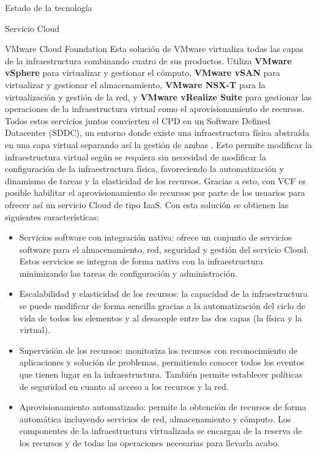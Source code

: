 \begin{chapter}{Estado de la tecnología}
\begin{section}{Servicio Cloud}
\begin{subsection}{VMware Cloud Foundation}
        Esta solución de VMware virtualiza todas las capas de la infraestructura combinando cuatro de sus productos. Utiliza \textbf{VMware vSphere} para virtualizar y gestionar el cómputo, \textbf{VMware vSAN} para virtualizar y gestionar el almacenamiento, \textbf{VMware NSX-T} para la virtualización y gestión de la red, y \textbf{VMware vRealize Suite} para gestionar las operaciones de la infraestructura virtual como el aprovisionamiento de recursos. Todos estos servicios juntos convierten el CPD en un Software Defined Datacenter (SDDC), un entorno donde existe una infraestructura física abstraída en una capa virtual separando así la gestión de ambas \cite{sddc-definition}. Esto permite modificar la infraestructura virtual según se requiera sin necesidad de modificar la configuración de la infraestructura física, favoreciendo la automatización y dinamismo de tareas y la elasticidad de los recursos. Gracias a esto, con VCF es posible habilitar el aprovisionamiento de recursos por parte de los usuarios para ofrecer así un servicio Cloud de tipo IaaS. Con esta solución se obtienen las siguientes características:
        
    \begin{itemize}
        \item Servicios software con integración nativa: ofrece un conjunto de servicios software para el almacenamiento, red, seguridad y gestión del servicio Cloud. Estos servicios se integran de forma nativa con la infraestructura minimizando las tareas de configuración y administración.
        \item Escalabilidad y elasticidad de los recursos: la capacidad de la infraestructura se puede modificar de forma sencilla gracias a la automatización del ciclo de vida de todos los elementos y al desacople entre las dos capas (la física y la virtual).
        \item Supervisión de los recursos: monitoriza los recursos con reconocimiento de aplicaciones y solución de problemas, permitiendo conocer todos los eventos que tienen lugar en la infraestructura. También permite establecer políticas de seguridad en cuanto al acceso a los recursos y la red.
        \item Aprovisionamiento automatizado: permite la obtención de recursos de forma automática incluyendo servicios de red, almacenamiento y cómputo. Los componentes de la infraestructura virtualizada se encargan de la reserva de los recursos y de todas las operaciones necesarias para llevarla acabo.
    

\end{itemize}
\end{subsection}
\end{section}
\end{chapter}
